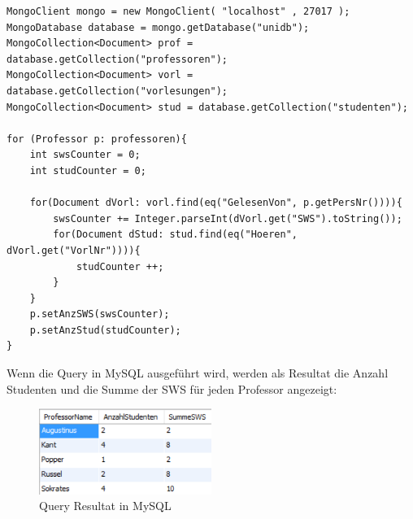 \begin{lstlisting}[basicstyle=\scriptsize]
MongoClient mongo = new MongoClient( "localhost" , 27017 );
MongoDatabase database = mongo.getDatabase("unidb");
MongoCollection<Document> prof = database.getCollection("professoren");
MongoCollection<Document> vorl = database.getCollection("vorlesungen");
MongoCollection<Document> stud = database.getCollection("studenten");

for (Professor p: professoren){
	int swsCounter = 0;
	int studCounter = 0;
	
	for(Document dVorl: vorl.find(eq("GelesenVon", p.getPersNr()))){
		swsCounter += Integer.parseInt(dVorl.get("SWS").toString());
		for(Document dStud: stud.find(eq("Hoeren", dVorl.get("VorlNr")))){
			studCounter ++;
		}
	}
	p.setAnzSWS(swsCounter);
	p.setAnzStud(studCounter);
}
\end{lstlisting}
 \noindent
Wenn die Query in MySQL ausgeführt wird, werden als Resultat die Anzahl Studenten und die Summe der SWS für jeden Professor angezeigt:

\begin{figure}[h] 
	\centering
	\includegraphics[width=0.5\textwidth]{./pictures/Query_MySQL_result.png}
	\caption{Query Resultat in MySQL}
	\label{fig:mysqlres}
\end{figure}

